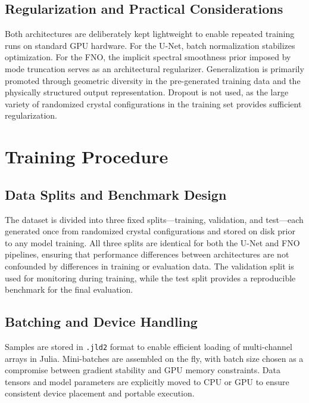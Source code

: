 \subsection{Regularization and Practical Considerations}

Both architectures are deliberately kept lightweight to enable repeated training runs on standard GPU hardware. For the U-Net, batch normalization stabilizes optimization. For the FNO, the implicit spectral smoothness prior
imposed by mode truncation serves as an architectural regularizer. Generalization is primarily promoted through geometric diversity in the pre-generated training data and the physically structured output representation. Dropout is not used, as the large variety of randomized crystal configurations in the training set provides sufficient regularization.

\section{Training Procedure}
\label{sec:training}

\subsection{Data Splits and Benchmark Design}

The dataset is divided into three fixed splits—training, validation, and test—each generated once from randomized crystal configurations and stored on disk prior to any model training. All three splits are identical for both
the U-Net and FNO pipelines, ensuring that performance differences between architectures are not confounded by differences in training or evaluation data. The validation split is used for monitoring during training, while the
test split provides a reproducible benchmark for the final evaluation. 

\subsection{Batching and Device Handling}

Samples are stored in \texttt{.jld2} format to enable efficient loading of multi-channel arrays in Julia. Mini-batches are assembled on the fly, with batch size chosen as a compromise between gradient stability and GPU memory
constraints. Data tensors and model parameters are explicitly moved to CPU or GPU to ensure consistent device placement and portable execution.

